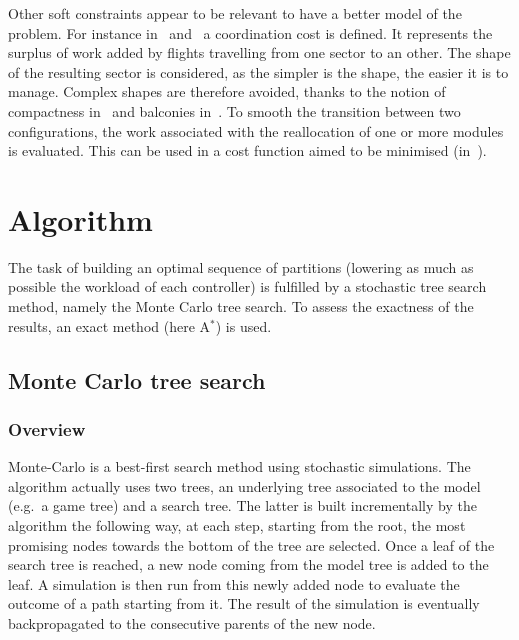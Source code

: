 \documentclass[oneside,twocolumn]{article}
\begin{document}
Other soft constraints appear to be relevant to have a better model of
the problem. For instance in~\cite{sergeeva2017dynamic}
and~\cite{bedouet2016towards} a
coordination cost is defined. It represents the surplus of work added by
flights travelling from one sector to an other. The shape of the
resulting sector is considered, as the simpler is
the shape, the easier it is to manage. Complex shapes are therefore avoided,
thanks to the notion of compactness in~\cite{jagare2013airspace} and balconies
in~\cite{sergeeva2017dynamic}. To smooth the transition between two
configurations, the work associated with the reallocation of one or more modules
is evaluated. This can be used in a cost function aimed to be minimised
(in~\cite{bedouet2016towards}).

\section{Algorithm}

The task of building an optimal sequence of partitions (lowering
as much as possible the workload of each controller) is fulfilled by a
stochastic tree search method, namely the Monte Carlo tree search. To assess the
exactness of the results, an exact method (here A\(^*\)) is used.

\subsection{Monte Carlo tree search}
\subsubsection{Overview}
Monte-Carlo is a best-first search method using stochastic simulations. The
algorithm actually uses two trees, an underlying tree associated to the model
(e.g.\ a game tree) and a search tree. The latter is built incrementally by the
algorithm the following way, at each step, starting from the root, the most
promising nodes towards the bottom of the tree are selected. Once a leaf of the
search tree is reached, a new node coming from the model tree is added to the
leaf. A simulation is then run from this newly added node to evaluate the
outcome of a path starting from it. The result of the simulation is eventually
backpropagated to the consecutive parents of the new node.
\end{document}
